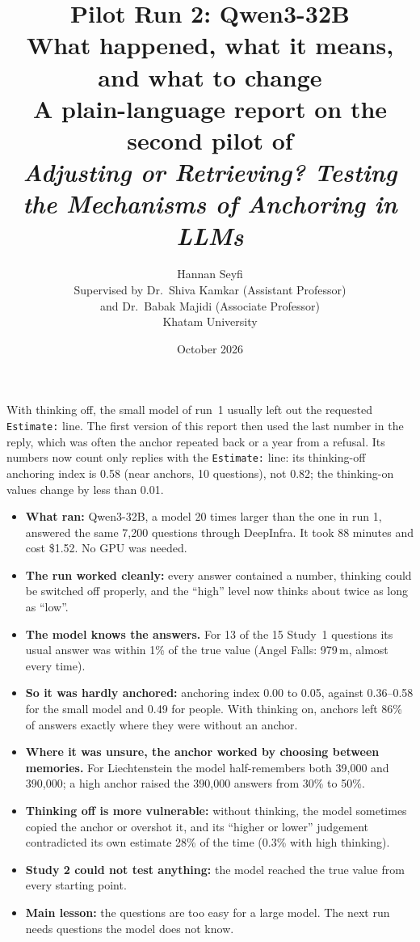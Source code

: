 \documentclass[11pt,a4paper]{article}
\title{\textbf{Pilot Run 2: Qwen3-32B}\\[4pt]
\large What happened, what it means, and what to change\\[2pt]
\normalsize A plain-language report on the second pilot of\\
\emph{Adjusting or Retrieving? Testing the Mechanisms of Anchoring in LLMs}}
\author{Hannan Seyfi\\[8pt]
\normalsize Supervised by Dr.\ Shiva Kamkar (Assistant Professor)\\
\normalsize and Dr.\ Babak Majidi (Associate Professor)\\[8pt]
\normalsize Khatam University}
\date{October 2026}
\begin{document}
\maketitle

\begin{tcolorbox}[colback=yellow!8, colframe=orange!60, title=\textbf{Correction (30 October 2026)}, fonttitle=\normalsize]
With thinking off, the small model of run~1 usually left out the requested \texttt{Estimate:} line. The first version of this report then used the last number in the reply, which was often the anchor repeated back or a year from a refusal. Its numbers now count only replies with the \texttt{Estimate:} line: its thinking-off anchoring index is 0.58 (near anchors, 10 questions), not 0.82; the thinking-on values change by less than 0.01.
\end{tcolorbox}

\begin{tcolorbox}[colback=gray!6, colframe=gray!50, title=\textbf{At a glance}, fonttitle=\normalsize]
\begin{itemize}[leftmargin=*]
  \item \textbf{What ran:} Qwen3-32B, a model 20 times larger than the one in run 1, answered the same 7,200 questions through DeepInfra. It took 88 minutes and cost \$1.52. No GPU was needed.
  \item \textbf{The run worked cleanly:} every answer contained a number, thinking could be switched off properly, and the \enquote{high} level now thinks about twice as long as \enquote{low}.
  \item \textbf{The model knows the answers.} For 13 of the 15 Study~1 questions its usual answer was within 1\% of the true value (Angel Falls: 979\,m, almost every time).
  \item \textbf{So it was hardly anchored:} anchoring index 0.00 to 0.05, against 0.36--0.58 for the small model and 0.49 for people. With thinking on, anchors left 86\% of answers exactly where they were without an anchor.
  \item \textbf{Where it was unsure, the anchor worked by choosing between memories.} For Liechtenstein the model half-remembers both 39,000 and 390,000; a high anchor raised the 390,000 answers from 30\% to 50\%.
  \item \textbf{Thinking off is more vulnerable:} without thinking, the model sometimes copied the anchor or overshot it, and its \enquote{higher or lower} judgement contradicted its own estimate 28\% of the time (0.3\% with high thinking).
  \item \textbf{Study 2 could not test anything:} the model reached the true value from every starting point.
  \item \textbf{Main lesson:} the questions are too easy for a large model. The next run needs questions the model does not know.
\end{itemize}
\end{tcolorbox}
\end{document}
